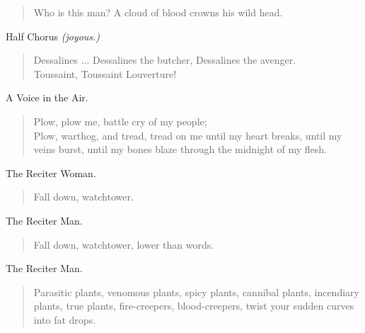 \documentclass[letterpaper,article,12pt,oneside,notitlepage]{memoir}
\begin{document}
\begin{verse}
Who is this man? A cloud of blood crowns his wild head. \\
\end{verse}

\clearpage

\begin{center}Half Chorus \textit{(joyous.)}\end{center}

\begin{verse}
Dessalines ... Dessalines the butcher, Dessalines the avenger. \\
Toussaint, Toussaint Louverture! \\
\end{verse}

\begin{center}A Voice in the Air.\end{center}

\begin{verse}
\hspace{1cm} Plow, plow me, battle cry of my people; \\
Plow, warthog, and tread, tread on me until my heart breaks, until my veins burst, until my bones blaze through the midnight of my flesh. \\
\end{verse}

\begin{center}The Reciter Woman.\end{center}

\begin{verse}
Fall down, watchtower. \\
\end{verse}

\begin{center}The Reciter Man.\end{center}

\begin{verse}
Fall down, watchtower, lower than words. \\
\end{verse}

\begin{center}The Reciter Man.\end{center}

\begin{verse}
Parasitic plants, venomous plants, spicy plants, cannibal plants, incendiary plants, true plants, fire-creepers, blood-creepers, twist your sudden curves into fat drops. \\
\end{verse}
\end{document}
